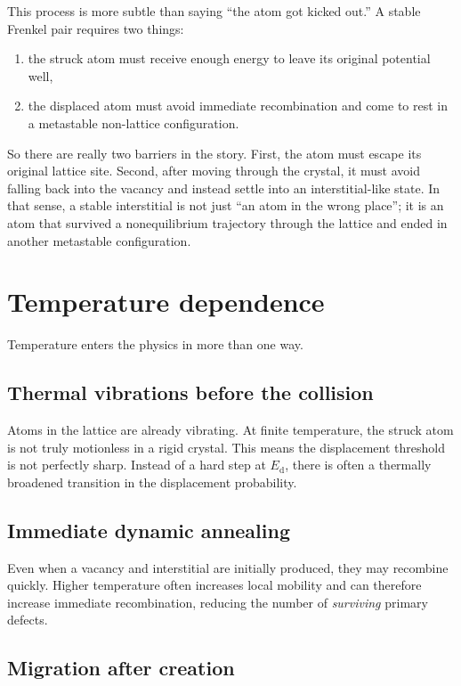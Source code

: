 \documentclass[11pt]{article}
\newcommand{\Ed}{E_{\mathrm d}}
\begin{document}
This process is more subtle than saying ``the atom got kicked out.'' A stable Frenkel pair requires two things:
\begin{enumerate}[label=\arabic*.]
    \item the struck atom must receive enough energy to leave its original potential well,
    \item the displaced atom must avoid immediate recombination and come to rest in a metastable non-lattice configuration.
\end{enumerate}

So there are really two barriers in the story. First, the atom must escape its original lattice site. Second, after moving through the crystal, it must avoid falling back into the vacancy and instead settle into an interstitial-like state. In that sense, a stable interstitial is not just ``an atom in the wrong place''; it is an atom that survived a nonequilibrium trajectory through the lattice and ended in another metastable configuration.

\section{Temperature dependence}

Temperature enters the physics in more than one way.

\subsection{Thermal vibrations before the collision}

Atoms in the lattice are already vibrating. At finite temperature, the struck atom is not truly motionless in a rigid crystal. This means the displacement threshold is not perfectly sharp. Instead of a hard step at $\Ed$, there is often a thermally broadened transition in the displacement probability.

\subsection{Immediate dynamic annealing}

Even when a vacancy and interstitial are initially produced, they may recombine quickly. Higher temperature often increases local mobility and can therefore increase immediate recombination, reducing the number of \emph{surviving} primary defects.

\subsection{Migration after creation}
\end{document}
